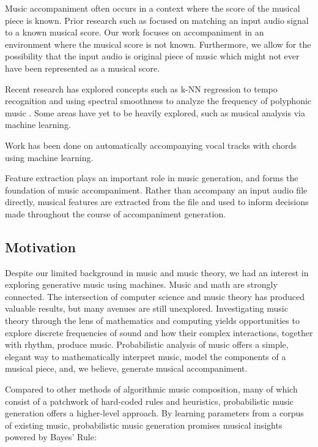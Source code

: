 \documentclass[11pt,conference,letterpaper]{IEEEtran}
\begin{document}
Music accompaniment often occurs in a context where the score of the musical piece is known. Prior research such as \cite{dannenberg1984line} focused on matching an input audio signal to a known musical score. Our work focuses on accompaniment in an environment where the musical score is not known. Furthermore, we allow for the possibility that the input audio is original piece of music which might not ever have been represented as a musical score.

Recent research has explored concepts such as k-NN regression to tempo recognition \cite{eronen2010music} and using spectral smoothness to analyze the frequency of polyphonic music \cite{klapuri2003multiple}. Some areas have yet to be heavily explored, such as musical analysis via machine learning.

Work has been done on automatically accompanying vocal tracks with chords \cite{simon2008mysong} using machine learning. \cite{morris2008exposing}

Feature extraction plays an important role in music generation, and forms the foundation of music accompaniment. Rather than accompany an input audio file directly, musical features are extracted from the file and used to inform decisions made throughout the course of accompaniment generation.

\subsection{Motivation}

Despite our limited background in music and music theory, we had an interest in exploring generative music using machines. Music and math are strongly connected. The intersection of computer science and music theory has produced valuable results, but many avenues are still unexplored. Investigating music theory through the lens of mathematics and computing yields opportunities to explore discrete frequencies of sound and how their complex interactions, together with rhythm, produce music. Probabilistic analysis of music offers a simple, elegant way to mathematically interpret music, model the components of a musical piece, and, we believe, generate musical accompaniment.

Compared to other methods of algorithmic music composition, many of which consist of a patchwork of hard-coded rules and heuristics, probabilistic music generation offers a higher-level approach. By learning parameters from a corpus of existing music, probabilistic music generation promises musical insights powered by Bayes' Rule:
\end{document}

